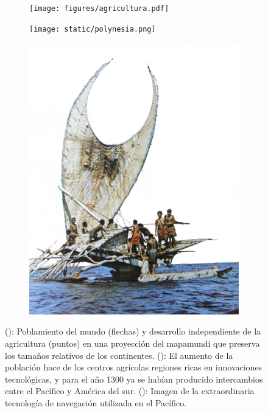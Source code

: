 \documentclass[a4paper,11pt]{book}
\theoremstyle{definition}
\begin{document}
\begin{figure}[ht!]
\centering
 \begin{subfigure}[b]{0.145\textwidth} \centering
  \texttt{[image: figures/agricultura.pdf]}
  \caption{}
  \label{fig:poblamiento}
  \end{subfigure}
 \begin{subfigure}[b]{0.45\textwidth} \centering
  \texttt{[image: static/polynesia.png]}
  \caption{}
  \label{fig:pacifico}
  \end{subfigure}
 \begin{subfigure}[b]{0.24\textwidth} \centering
  \includegraphics[width=\linewidth]{static/tonga_barco.jpg}
  \caption{}
  \label{fig:tecnologia}
  \end{subfigure}
 \caption{
(): Poblamiento del mundo (flechas) y desarrollo independiente de la agricultura (puntos) en una proyección del mapamundi que preserva los tamaños relativos de los continentes. (): El aumento de la población hace de los centros agrícolas regiones ricas en innovaciones tecnológicas, y para el año 1300 ya se habían producido intercambios entre el Pacífico y América del sur. (): Imagen de la extraordinaria tecnología de navegación utilizada en el Pacífico.
 }
 \label{fig:desert}
 \end{figure}
\end{document}
